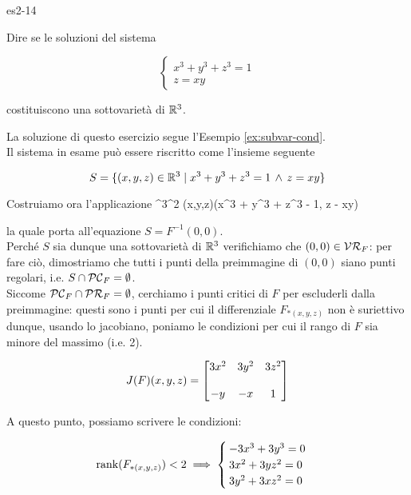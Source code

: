 
{es2-14}
{
Dire se le soluzioni del sistema

\begin{equation}
	\begin{cases}
		x^{3} + y^{3} + z^{3} = 1 \\
		z = xy
	\end{cases}
\end{equation}

costituiscono una sottovarietà di $ \mathbb{R}^{3} $.
}
{
La soluzione di questo esercizio segue l'Esempio \ref{ex:subvar-cond}. \\
Il sistema in esame può essere riscritto come l'insieme seguente

\begin{equation}
	S = \{ (x,y,z) \in \mathbb{R}^{3} \mid x^{3} + y^{3} + z^{3} = 1 \, \wedge \, z = xy \}
\end{equation}

Costruiamo ora l'applicazione
%
	{\R^{3}}{\R^{2}}
	{(x,y,z)}{(x^{3} + y^{3} + z^{3} - 1, z - xy)}

la quale porta all'equazione $ S = F^{-1}(0,0) $. \\
Perché $ S $ sia dunque una sottovarietà di $ \mathbb{R}^{3} $ verifichiamo che $ (0,0) \in \mathcal{VR}_{F} $: per fare ciò, dimostriamo che tutti i punti della preimmagine di $ (0,0) $ siano punti regolari, i.e. $ S \cap \mathcal{PC}_{F} = \emptyset $. \\
Siccome $ \mathcal{PC}_{F} \cap \mathcal{PR}_{F} = \emptyset $, cerchiamo i punti critici di $ F $ per escluderli dalla preimmagine: questi sono i punti per cui il differenziale $ F_{*(x,y,z)} $  non è suriettivo dunque, usando lo jacobiano, poniamo le condizioni per cui il rango di $ F $ sia minore del massimo (i.e. 2).

\begin{equation}
	J(F)(x,y,z) = \bmqty{ %
							3 x^{2} & 3 y^{2} & 3 z^{2} \\ \\
							- y 	& - x	  & 1 %
							}
\end{equation}

A questo punto, possiamo scrivere le condizioni:

\begin{equation}
	\rank(F_{*(x,y,z)}) < 2 %
	\implies %
	\begin{cases}
		- 3 x^{3} + 3 y^{3} = 0 \\
		3 x^{2} + 3 y z^{2} = 0 \\
		3 y^{2} + 3 x z^{2} = 0
	\end{cases}
\end{equation}

}
